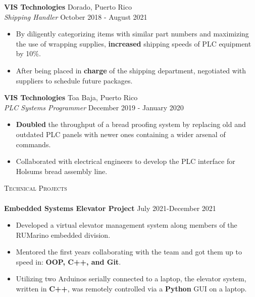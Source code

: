 \documentclass[a4paper]{article}
\newcommand{\lineunder} {
    \vspace*{-8pt} \\
    \hspace*{-18pt} \hrulefill \\
}
\newcommand{\header} [1] {
    {\hspace*{-18pt}\vspace*{6pt} \textsc{#1}}
    \vspace*{-6pt} \lineunder
}
\begin{document}
\textbf{VIS Technologies} \hfill Dorado, Puerto Rico\\
\textit{Shipping Handler} \hfill October 2018 - August 2021\\
\vspace{-2mm}

\begin{itemize} \itemsep -1pt
	\item By diligently categorizing items with similar part numbers and maximizing the use of wrapping supplies, \textbf{increased} shipping speeds of PLC equipment by 10\%.
	\item After being placed in \textbf{charge} of the shipping department, negotiated with suppliers to schedule future packages.
\end{itemize}

\textbf{VIS Technologies} \hfill Toa Baja, Puerto Rico\\
\textit{PLC Systems Programmer} \hfill December 2019 - January 2020\\
\vspace{-2mm}
\begin{itemize} \itemsep -1pt
	\item \textbf{Doubled} the throughput of a bread proofing system by replacing old and outdated PLC panels with newer ones containing a wider arsenal of commands.
	\item Collaborated with electrical engineers to develop the PLC interface for Holsum\textquotesingle{}s bread assembly line.
\end{itemize}

\header{Technical Projects}
{\textbf{Embedded Systems Elevator Project}} \hfill \hfill July 2021-December 2021\\
\vspace{-1mm}

\begin{itemize} \itemsep -1pt
\item Developed a virtual elevator management system along members of the RUMarino embedded division.

\item Mentored the first years collaborating with the team and got them up to speed in: \textbf{OOP, C++, and Git}.

\item Utilizing two Arduinos serially connected to a laptop, the elevator system, written in \textbf{C++}, was remotely controlled via a \textbf{Python} GUI on a laptop.\\
\vspace*{-1mm}
\end{itemize}
\end{document}
